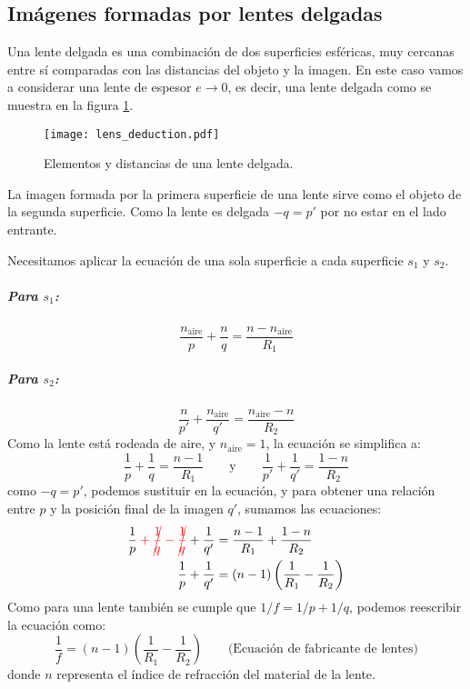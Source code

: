 \subsection{Imágenes formadas por lentes delgadas}

Una lente delgada es una combinación de dos superficies esféricas, muy cercanas entre sí comparadas con las distancias del objeto y la imagen. En este caso vamos a considerar una lente de espesor \(e \to 0\), es decir, una lente delgada como se muestra en la figura \ref{fig:lens_deduction}.
\begin{figure}[ht]
  \centering
  \texttt{[image: lens\_deduction.pdf]}
  \caption{Elementos y distancias de una lente delgada.}
  \label{fig:lens_deduction}
\end{figure}

La imagen formada por la primera superficie de una lente sirve como el objeto de la segunda superficie. Como la lente es delgada \(-q=p'\) por no estar en el lado entrante. 

Necesitamos aplicar la ecuación de una sola superficie a cada superficie \(s_1\) y \(s_2\).

\subparagraph{Para \(s_1\):}

\begin{equation*}
  \frac{n_\text{aire}}{p} + \frac{n}{q} = \frac{n - n_\text{aire}}{R_1}
\end{equation*}

\subparagraph{Para \(s_2\):}

\begin{equation*}
  \frac{n}{p'} + \frac{n_\text{aire}}{q'} = \frac{n_\text{aire} - n}{R_2}
\end{equation*}
Como la lente está rodeada de aire, y \(n_\text{aire} = 1\), la ecuación se simplifica a:
\begin{equation*}
  \frac{1}{p} + \frac{1}{q} = \frac{n-1}{R_1} \qquad \text{y} \qquad \frac{1}{p'} + \frac{1}{q'} = \frac{1 - n}{R_2}
\end{equation*}
como \(-q=p'\), podemos sustituir en la ecuación, y para obtener una relación entre \(p\) y la posición final de la imagen \(q'\), sumamos las ecuaciones:
\begin{align*}
  \frac{1}{p} \color{red}+\cancel{\frac{1}{q}} - \cancel{\frac{1}{q}}\color{black} + \frac{1}{q'} &= \frac{n-1}{R_1} + \frac{1-n}{R_2} \\
  \frac{1}{p} + \frac{1}{q'} &= (n - 1) \left( \frac{1}{R_1} - \frac{1}{R_2} \right)
\end{align*}
Como para una lente también se cumple que \(1/f = 1/p + 1/q\), podemos reescribir la ecuación como:
\begin{equation}
  \frac{1}{f} = (n - 1) \left( \frac{1}{R_1} - \frac{1}{R_2} \right) \qquad \text{(Ecuación de fabricante de lentes)}
\end{equation}
donde \(n\) representa el índice de refracción del material de la lente.

